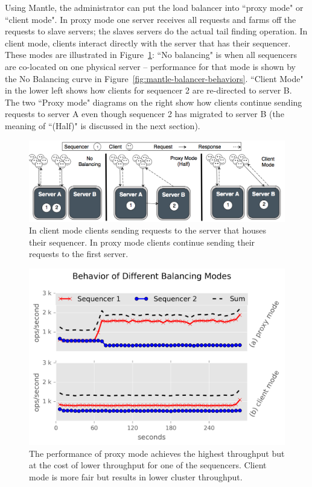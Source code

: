 Using Mantle, the administrator can put the load balancer into ``proxy
mode" or ``client mode". In proxy mode one server receives all requests and
farms off the requests to slave servers; the slaves servers do the actual tail
finding operation. In client mode, clients interact directly with the server
that has their sequencer.  These modes are illustrated in
Figure~\ref{fig:mantle-modes}: ``No balancing" is when all sequencers are
co-located on one physical server -- performance for that mode is shown by the
No Balancing curve in Figure~\ref{fig:mantle-balancer-behaviors}.  ``Client
Mode" in the lower left shows how clients for sequencer 2 are re-directed to
server B. The two ``Proxy mode" diagrams on the right show how clients continue
sending requests to server A even though sequencer 2 has migrated to server B
(the meaning of ``(Half)" is discussed in the next section).

\begin{figure}[t!]
\centering
\includegraphics{figures/mantle-modes.png}
\caption{ In client mode clients sending requests to the server that houses
their sequencer. In proxy mode clients continue sending their requests to the
first server.  }\label{fig:mantle-modes}
\end{figure}

\begin{figure}[t!]
\centering
\includegraphics{figures/mantle-mode-behavior.png}
\caption{The performance of proxy mode achieves the highest throughput but at
the cost of lower throughput for one of the sequencers. Client mode is more
fair but results in lower cluster throughput.
}\label{fig:mantle-mode-behavior}
\end{figure}

